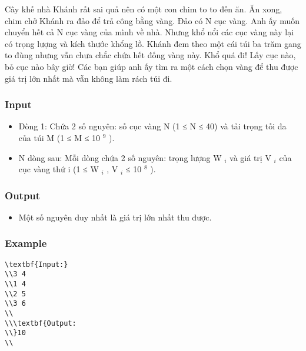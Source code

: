 



   Cây khế nhà Khánh rất sai quả nên có một con chim to to đến ăn. Ăn xong, chim chở Khánh ra đảo để trả công bằng vàng. Đảo có N cục vàng. Anh ấy muốn chuyển hết cả N cục vàng của mình về nhà. Nhưng khổ nổi các cục vàng này lại có trọng lượng và kích thước khổng lồ. Khánh đem theo một cái túi ba trăm gang to đùng nhưng vẫn chưa chắc chứa hết đống vàng này. Khổ quá đi! Lấy cục nào, bỏ cục nào bây giờ! Các bạn giúp anh ấy tìm ra một cách chọn vàng để thu được giá trị lớn nhất mà vẫn không làm rách túi đi.  

\subsubsection{   Input  }
\begin{itemize}
	\item     Dòng 1: Chứa 2 số nguyên: số cục vàng N (1 ≤ N ≤ 40) và tải trọng tối đa của túi M (1 ≤ M ≤ 10    $^     9    $    ).   
	\item     N dòng sau: Mỗi dòng chứa 2 số nguyên: trọng lượng W    $_     i    $    và giá trị V    $_     i    $    của cục vàng thứ i (1 ≤ W    $_     i    $    , V    $_     i    $    ≤ 10    $^     8    $    ).   
\end{itemize}

\subsubsection{   Output  }
\begin{itemize}
	\item     Một số nguyên duy nhất là giá trị lớn nhất thu được.   
\end{itemize}

\subsubsection{   Example  }
\begin{verbatim}
\textbf{Input:}
\\3 4
\\1 4
\\2 5
\\3 6
\\
\\\textbf{Output:
\\}10
\\\end{verbatim}